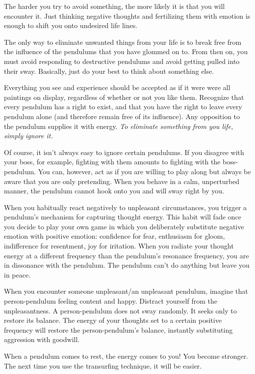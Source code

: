 \documentclass[
  openany]{book}
\begin{document}
The harder you try to avoid something, the more likely it is that you will encounter it. Just thinking negative thoughts and fertilizing them with emotion is enough to shift you onto undesired life lines.

The only way to eliminate unwanted things from your life is to break free from the influence of the pendulums that you have glommed on to. From then on, you must avoid responding to destructive pendulums and avoid getting pulled into their sway. Basically, just do your best to think about something else.

Everything you see and experience should be accepted as if it were were all paintings on display, regardless of whether or not you like them. Recognize that every pendulum has a right to exist, and that you have the right to leave every pendulum alone (and therefore remain free of its influence). Any opposition to the pendulum supplies it with energy. \emph{To eliminate something from you life, simply ignore it.}

Of course, it isn't always easy to ignore certain pendulums. If you disagree with your boss, for example, fighting with them amounts to fighting with the boss-pendulum. You can, however, act as if you are willing to play along but always be aware that you are only pretending. When you behave in a calm, unperturbed manner, the pendulum cannot hook onto you and will sway right by you.

When you habitually react negatively to unpleasant circumstances, you trigger a pendulum's mechanism for capturing thought energy. This habit will fade once you decide to play your own game in which you deliberately substitute negative emotion with positive emotion: confidence for fear, enthusiasm for gloom, indifference for resentment, joy for iritation. When you radiate your thought energy at a different frequency than the pendulum's resonance frequency, you are in dissonance with the pendulum. The pendulum can't do anything but leave you in peace.

When you encounter someone unpleasant/an unpleasant pendulum, imagine that person-pendulum feeling content and happy. Distract yourself from the unpleasantness. A person-pendulum does not sway randomly. It seeks only to restore its balance. The energy of your thoughts set to a certain positive frequency will restore the person-pendulum's balance, instantly substituting aggression with goodwill.

When a pendulum comes to rest, the energy comes to you! You become stronger. The next time you use the transurfing technique, it will be easier.
\end{document}
